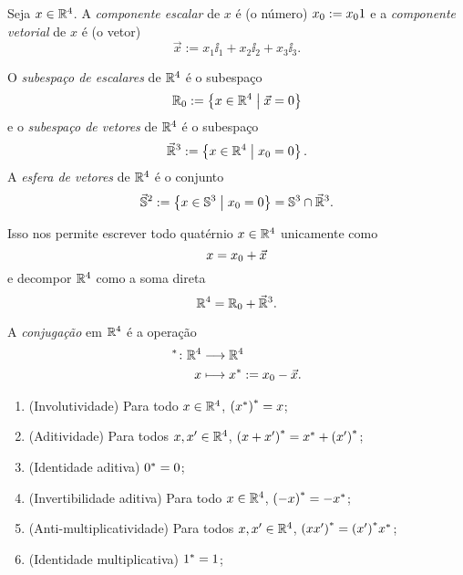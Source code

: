 \begin{definition}
Seja $x \in \mathbb{R}^4$. A \emph{componente escalar} de $x$ é (o número) ${x}_0 := x_0 1$ e a \emph{componente vetorial} de $x$ é (o vetor)
	\begin{equation*}
	\vec{x} := x_1 \ii_1 + x_2 \ii_2 + x_3 \ii_3.
	\end{equation*}

O \emph{subespaço de escalares} de $\mathbb{R}^4$ é o subespaço
	\begin{equation*}
	{\mathbb{R}}_0 := \left\{ x \in \mathbb{R}^4 \;\middle\vert\; \vec{x}=0 \right\}
	\end{equation*}
e o \emph{subespaço de vetores} de $\mathbb{R}^4$ é o subespaço
	\begin{equation*}
	\vec{\mathbb{R}}^3 := \left\{ x \in \mathbb{R}^4 \;\middle\vert\; {x}_0=0 \right\}.
	\end{equation*}
A \emph{esfera de vetores} de $\mathbb{R}^4$ é o conjunto
	\begin{equation*}
	\vec{\mathbb{S}}^2 := \left\{ x \in \mathbb{S}^3 \;\middle\vert\; {x}_0=0 \right\} = \mathbb{S}^3 \cap \vec{\mathbb{R}}^3.
	\end{equation*}
\end{definition}

Isso nos permite escrever todo quatérnio $x \in \mathbb{R}^4$ unicamente como
	\begin{equation*}
	x = {x}_0 + \vec{x}
	\end{equation*}
e decompor $\mathbb{R}^4$ como a soma direta
	\begin{equation*}
	\mathbb{R}^4 = {\mathbb{R}}_0 + \vec{\mathbb{R}}^3.
	\end{equation*}


\begin{definition}
A \emph{conjugação} em $\mathbb{R}^4$ é a operação
	\begin{align*}
	{{}^{\ast}}\colon {\mathbb{R}^4} &\longrightarrow {\mathbb{R}^4} \\{x} &\longmapsto {x}^{\ast} := {x}_0-\vec{x}.
	\end{align*}
\end{definition}

\begin{exercise}
	\begin{enumerate}
	\item (Involutividade) Para todo $x \in \mathbb{R}^4$, ${({x}^{\ast})}^{\ast} = x$;
	\item (Aditividade) Para todos $x,x' \in \mathbb{R}^4$, ${(x+x')}^{\ast} = {x}^{\ast} + {(x')}^{\ast}$;
	\item (Identidade aditiva) ${0}^{\ast} = 0$;
	\item (Invertibilidade aditiva) Para todo $x \in \mathbb{R}^4$, ${(-x)}^{\ast} = -{x}^{\ast}$;
	\item (Anti-multiplicatividade) Para todos $x,x' \in \mathbb{R}^4$, ${(xx')}^{\ast} = {(x')}^{\ast}{x}^{\ast}$;
	\item (Identidade multiplicativa) ${1}^{\ast} = 1$;
	\end{enumerate}
\end{exercise}


